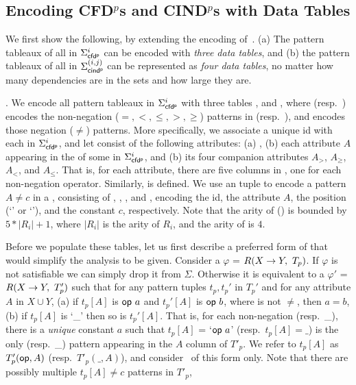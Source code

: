 \vspace{-1ex}
\subsection{Encoding CFD$^p$s and CIND$^p$s with Data Tables}

We first show the following, by extending the encoding
of~\cite{CFDs,icde08}.
(a) The pattern tableaux
of all \pCFDs in $\Sigma_{{\mathsf{cfd^p}}}^i$ can be encoded with {\em three data tables},
and
(b) the pattern tableaux of all \pCINDs in $\Sigma_{{\mathsf{cind^p}}}^{(i,j)}$ can be
represented as
{\em four data tables}, no matter how many dependencies are
in the sets and how large they are.


. We encode all  pattern tableaux
in $\Sigma_{{\mathsf{cfd^p}}}^i$ with three tables ,  and \Enc{\ne}, where
 (resp.~) encodes the non-negation ($=,<,
\le, >, \ge$) patterns in \LHS (resp.~\RHS),
and
\Enc{\ne} encodes those negation ($\ne$) patterns.
More specifically, we associate a unique id  with each
\pCFDs in $\Sigma_{{\mathsf{cfd^p}}}^i$, and let
 consist of the following
attributes: (a) , (b)
each attribute $A$ appearing in the \LHS of some \pCFDs in $\Sigma_{{\mathsf{cfd^p}}}^i$, and
 (b) its four companion attributes $A_{>}$, $A_{\ge}$, $A_{<}$, and
 $A_{\le}$. That is, for each attribute, there are five columns in
 , one for each non-negation operator.
Similarly,  is defined. We use an \Enc{\ne} tuple to encode a
pattern $A \ne c$ in a \pCFD, consisting of , ,
, and , encoding the \pCFD id, the attribute $A$,
the position (`\LHS' or `\RHS'), and the constant $c$, respectively.
Note that the arity of  () is bounded by $5*|R_i|+1$,
where $|R_i|$ is the arity of $R_i$, and the arity of \Enc{\ne} is
$4$.

Before we populate these tables, let us first describe a preferred
form of \pCFDs that would simplify the analysis to be given.
Consider a \pCFD $\varphi$ = $R(X\rightarrow Y,\ T_p)$. If $\varphi$ is not
satisfiable we can simply drop it from $\Sigma$. Otherwise it is
equivalent to a \pCFD $\varphi'$ = $R(X\rightarrow Y,\ T_p')$ such that for
any pattern tuples $t_p, t_p'$ in $T_p'$ and for any attribute $A$
in $X\cup Y$, (a) if $t_p[A]$ is $\op a$ and $t_p'[A]$ is $\op b$,
where \op is not $\ne$, then $a=b$, (b) if $t_p[A]$ is `\_' then so
is $t_p'[A]$. That is, for each non-negation \op (resp.~\_), there
is a {\em unique} constant $a$ such that $t_p[A]$ = `$\op a$'
(resp.~$t_p[A]=\_$) is the only \op (resp.~\_) pattern appearing in
the $A$ column of $T'_p$. We refer to $t_p[A]$ as $T'_p({\mathsf{op}},A)$
(resp.~$T'_p(\_,A)$), and consider \kwlog~\pCFDs of this form only.
Note that there are possibly multiple $t_p[A] \ne c$ patterns in
$T'_p$,

